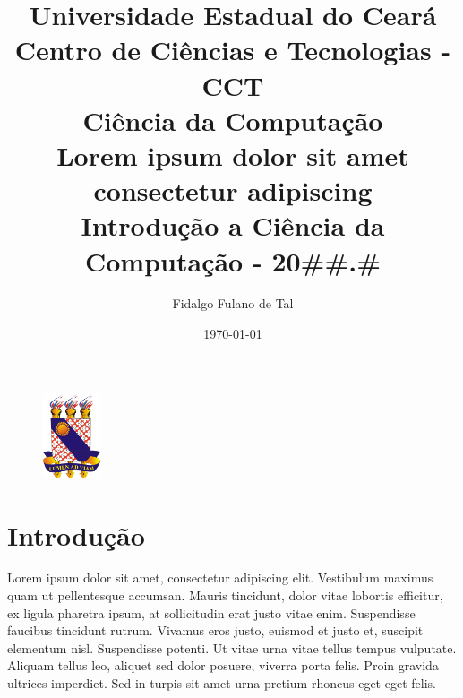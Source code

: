 \documentclass[12pt]{article}
\begin{document}
    
\begin{center}
    \begin{figure}
        \begin{center}
            \includegraphics[width=0.15\textwidth]{imagens/logo_uece}
        \end{center}
    \end{figure}
    
    \title
    {
        Universidade Estadual do Ceará \\
        Centro de Ciências e Tecnologias - CCT \\
        Ciência da Computação \\
        \vspace{2.5cm}
        Lorem ipsum dolor sit amet consectetur adipiscing  \\
        \large Introdução a Ciência da Computação - 20\#\#.\#
    }
    
    \author{Fidalgo Fulano de Tal}
    \date{\today}
    \maketitle
    \newpage
\end{center}


\section{Introdução}

Lorem ipsum dolor sit amet, consectetur adipiscing elit. Vestibulum maximus quam ut pellentesque accumsan. Mauris tincidunt, dolor vitae lobortis efficitur, ex ligula pharetra ipsum, at sollicitudin erat justo vitae enim. Suspendisse faucibus tincidunt rutrum. Vivamus eros justo, euismod et justo et, suscipit elementum nisl. Suspendisse potenti. Ut vitae urna vitae tellus tempus vulputate. Aliquam tellus leo, aliquet sed dolor posuere, viverra porta felis. Proin gravida ultrices imperdiet. Sed in turpis sit amet urna pretium rhoncus eget eget felis.
\end{document}
